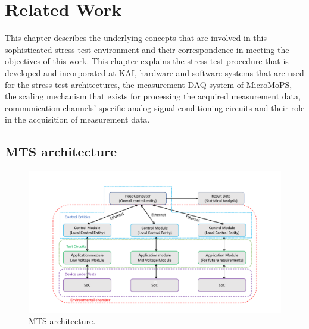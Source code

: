 \chapter{Related Work} 

This chapter describes the underlying concepts that are involved in this sophisticated stress test environment and their correspondence in meeting the objectives of this work. 
This chapter explains the stress test procedure that is developed and incorporated at KAI, hardware and software systems that are used for the stress test architectures, the measurement \Gls{DAQ} system of MicroMoPS, the scaling mechanism that exists for processing the acquired measurement data, communication channels' specific analog signal conditioning circuits and their role in the acquisition of measurement data.

 
\section{MTS architecture}\label{sec:MTS}
		\begin{figure}[htb]
		\centering
		\includegraphics[trim=80 0 0 0, clip, width=170mm]{images/MTS_architecture.pdf}
		\caption{MTS architecture.}
		\label{fig:MTS_image}
		\end{figure}


